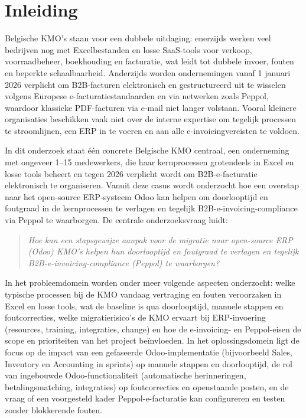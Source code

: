 \section{Inleiding}%
\label{sec:inleiding}

Belgische KMO’s staan voor een dubbele uitdaging: enerzijds werken veel bedrijven nog met Excelbestanden en losse SaaS-tools voor verkoop, voorraadbeheer, boekhouding en facturatie, wat leidt tot dubbele invoer, fouten en beperkte schaalbaarheid. Anderzijds worden ondernemingen vanaf 1 januari 2026 verplicht om B2B-facturen elektronisch en gestructureerd uit te wisselen volgens Europese e-facturatiestandaarden en via netwerken zoals Peppol, waardoor klassieke PDF-facturen via e-mail niet langer volstaan. Vooral kleinere organisaties beschikken vaak niet over de interne expertise om tegelijk processen te stroomlijnen, een ERP in te voeren en aan alle e-invoicingvereisten te voldoen.

In dit onderzoek staat één concrete Belgische KMO centraal, een onderneming met ongeveer 1–15 medewerkers, die haar kernprocessen grotendeels in Excel en losse tools beheert en tegen 2026 verplicht wordt om B2B-e-facturatie elektronisch te organiseren. Vanuit deze casus wordt onderzocht hoe een overstap naar het open-source ERP-systeem Odoo kan helpen om doorlooptijd en foutgraad in de kernprocessen te verlagen en tegelijk B2B-e-invoicing-compliance via Peppol te waarborgen. De centrale onderzoeksvraag luidt:

\begin{quote}
\emph{Hoe kan een stapsgewijze aanpak voor de migratie naar open-source ERP (Odoo) KMO’s helpen hun doorlooptijd en foutgraad te verlagen en tegelijk B2B-e-invoicing-compliance (Peppol) te waarborgen?}
\end{quote}

In het probleemdomein worden onder meer volgende aspecten onderzocht: welke typische processen bij de KMO vandaag vertraging en fouten veroorzaken in Excel en losse tools, wat de baseline is qua doorlooptijd, manuele stappen en foutcorrecties, welke migratierisico’s de KMO ervaart bij ERP-invoering (resources, training, integraties, change) en hoe de e-invoicing- en Peppol-eisen de scope en prioriteiten van het project beïnvloeden. In het oplossingsdomein ligt de focus op de impact van een gefaseerde Odoo-implementatie (bijvoorbeeld Sales, Inventory en Accounting in sprints) op manuele stappen en doorlooptijd, de rol van ingebouwde Odoo-\-functionaliteit (automatische herinneringen, betalingsmatching, integraties) op foutcorrecties en openstaande posten, en de vraag of een voorgesteld kader Peppol-e-facturatie kan configureren en testen zonder blokkerende fouten.

